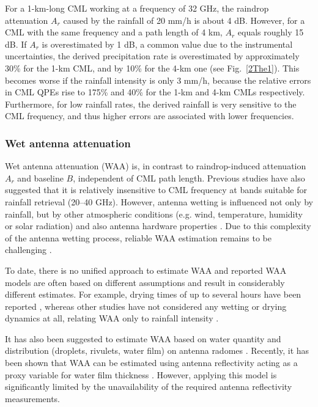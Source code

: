 \documentclass{ctuthesis}\usepackage[]{graphicx}\usepackage[]{color}
\begin{document}
For a 1-km-long CML working at a frequency of 32 GHz, the raindrop attenuation $A_r$ caused by the rainfall of 20 mm/h is about 4 dB. However, for a CML with the same frequency and a path length of 4 km, $A_r$ equals roughly 15 dB. If $A_r$ is overestimated by 1 dB, a common value due to the instrumental uncertainties, the derived precipitation rate is overestimated by approximately 30\% for the 1-km CML, and by 10\% for the 4-km one (see Fig.~\ref{2The1}). This becomes worse if the rainfall intensity is only 3 mm/h, because the relative errors in CML QPEs rise to 175\% and 40\% for the 1-km and 4-km CMLs respectively. Furthermore, for low rainfall rates, the derived rainfall is very sensitive to the CML frequency, and thus higher errors are associated with lower frequencies.


\subsubsection{Wet antenna attenuation} \label{WAAtheor}

Wet antenna attenuation (WAA) is, in contrast to raindrop-induced attenuation $A_r$ and baseline $B$, independent of CML path length. Previous studies \citep{leijnseMicrowaveLinkRainfall2008, overeemMeasuringUrbanRainfall2011} have also suggested that it is relatively insensitive to CML frequency at bands suitable for rainfall retrieval (20--40 GHz). However, antenna wetting is influenced not only by rainfall, but by other atmospheric conditions (e.g. wind, temperature, humidity or solar radiation) and also  antenna hardware properties \citep[e.g. antenna radome material or coating;][]{lethMeasurementCampaignAssess2018}. Due to this complexity of the antenna wetting process, reliable WAA estimation remains to be challenging \citep{chwalaCommercialMicrowaveLink2019}. 

To date, there is no unified approach to estimate WAA and reported WAA models are often based on different assumptions and result in considerably different estimates. For example, drying times of up to several hours have been reported \citep{schleissQuantificationModelingWetAntenna2013}, whereas other studies have not considered any wetting or drying dynamics at all, relating WAA only to rainfall intensity \citep{valtrExcessAttenuationCaused2019, kharadlyEffectWetAntenna2001}. 

It has also been suggested to estimate WAA based on water quantity and distribution (droplets, rivulets, water film) on antenna radomes \citep{leijnseMicrowaveLinkRainfall2008, manciniImpactWetSBand2019}. Recently, it has been shown that WAA can be estimated using antenna reflectivity acting as a proxy variable for water film thickness \citep{moroderModelingWetAntenna2019}. However, applying this model is significantly limited by the unavailability of the required antenna reflectivity measurements.
\end{document}
